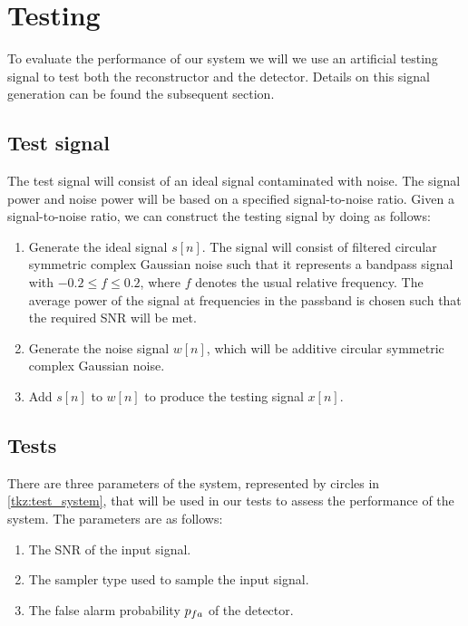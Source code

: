 \documentclass[a4paper, openany, oneside]{memoir}
\begin{document}
\section{Testing}
To evaluate the performance of our system we will we use an artificial testing signal to test both the reconstructor and the detector.
Details on this signal generation can be found the subsequent section.

\subsection{Test signal}\label{ssec:test_signal}
The test signal will consist of an ideal signal contaminated with noise. The signal power and noise power will be based on a specified signal-to-noise ratio. Given a signal-to-noise ratio, we can construct the testing signal by doing as follows:

\begin{enumerate}
	\item Generate the ideal signal $s[n]$. The signal will consist of filtered circular symmetric complex Gaussian noise such that it represents a bandpass signal with $-0.2 \leq f\leq 0.2$, where $f$ denotes the usual relative frequency. The average power of the signal at frequencies in the passband is chosen such that the required SNR will be met. 
	\item Generate the noise signal $w[n]$, which will be additive circular symmetric complex Gaussian noise.
	\item Add $s[n]$ to $w[n]$ to produce the testing signal $x[n]$.
\end{enumerate}

\subsection{Tests}
There are three parameters of the system, represented by circles in \cref{tkz:test_system}, that will be used in our tests to assess the performance of the system. The parameters are as follows:
\begin{enumerate}
	\item The SNR of the input signal.
	\item The sampler type used to sample the input signal.
	\item The false alarm probability $p\ss{fa}$ of the detector.
\end{enumerate}
\end{document}
